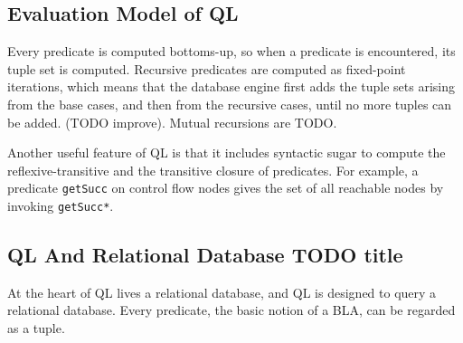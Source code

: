\subsection{Evaluation Model of QL}
\cite{qlpaper}
Every predicate is computed bottoms-up, so when a predicate is encountered, its
tuple set is computed.
Recursive predicates are computed as fixed-point iterations, which means that the database engine 
first adds the tuple sets arising from the base cases, and then from the recursive cases, until
no more tuples can be added. (TODO improve).
Mutual recursions are TODO.

Another useful feature of QL is that it includes syntactic sugar to compute the reflexive-transitive
and the transitive closure of predicates.
For example, a predicate \texttt{getSucc} on control flow nodes gives the set of all reachable
nodes by invoking \texttt{getSucc*}.

\subsection{QL And Relational Database TODO title}
At the heart of QL lives a relational database, and QL is designed to query a relational database.
Every predicate, the basic notion of a BLA, can be regarded as a tuple.


